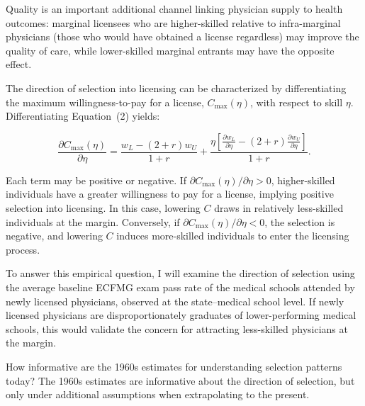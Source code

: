 \documentclass[12pt]{article}
\begin{document}
Quality is an important additional channel linking physician supply to health outcomes: marginal licensees who are higher-skilled relative to infra-marginal physicians (those who would have obtained a license regardless) may improve the quality of care, while lower-skilled marginal entrants may have the opposite effect.

The direction of selection into licensing can be characterized by differentiating the maximum willingness-to-pay for a license, $C_{\max}(\eta)$, with respect to skill $\eta$. Differentiating Equation~(2) yields:

\begin{equation}
    \frac{\partial C_{\max}(\eta)}{\partial \eta} = \frac{w_L - (2+r)w_U}{1+r} + \frac{\eta\left[\frac{\partial w_L}{\partial \eta} - (2+r)\frac{\partial w_U}{\partial \eta}\right]}{1+r}.
\end{equation}

Each term may be positive or negative. If $\partial C_{\max}(\eta)/\partial \eta > 0$, higher-skilled individuals have a greater willingness to pay for a license, implying positive selection into licensing. In this case, lowering $C$ draws in relatively less-skilled individuals at the margin. Conversely, if $\partial C_{\max}(\eta)/\partial \eta < 0$, the selection is negative, and lowering $C$ induces more-skilled individuals to enter the licensing process.

To answer this empirical question, I will examine the direction of selection using the average baseline ECFMG exam pass rate of the medical schools attended by newly licensed physicians, observed at the state–medical school level. If newly licensed physicians are disproportionately graduates of lower-performing medical schools, this would validate the concern for attracting less-skilled physicians at the margin.

How informative are the 1960s estimates for understanding selection patterns today? The 1960s estimates are informative about the direction of selection, but only under additional assumptions when extrapolating to the present. 
\end{document}
